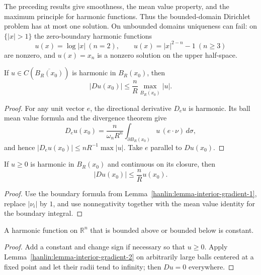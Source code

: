 \begin{remark}\label{hanlin:remark-mvp-harmonic-smooth}
The preceding results give smoothness, the mean value property, and the maximum
principle for harmonic functions. Thus the bounded-domain Dirichlet problem
has at most one solution. On unbounded domains uniqueness can fail: on
$\{|x|>1\}$ the zero-boundary harmonic functions
\[
u(x)=\log|x|\ (n=2),\qquad u(x)=|x|^{2-n}-1\ (n\ge3)
\]
are nonzero, and $u(x)=x_n$ is a nonzero solution on the upper half-space.
\end{remark}

\begin{lemma}\label{hanlin:lemma-interior-gradient-1}


If $u\in C(\overline{B_R(x_0)})$ is harmonic in $B_R(x_0)$, then
\[
|Du(x_0)|\le\frac nR\max_{\overline{B_R(x_0)}}|u|.
\]
\end{lemma}
\begin{proof}
\sketch For any unit vector $e$, the directional derivative $D_eu$ is harmonic.
Its ball mean value formula and the divergence theorem give
\[
D_eu(x_0)=\frac n{\omega_nR^n}\int_{\partial B_R(x_0)}u\,(e\cdot\nu)\,d\sigma,
\]
and hence $|D_eu(x_0)|\le nR^{-1}\max|u|$. Take $e$ parallel to $Du(x_0)$.
\end{proof}

\begin{lemma}\label{hanlin:lemma-interior-gradient-2}


If $u\ge0$ is harmonic in $B_R(x_0)$ and continuous on its closure, then
\[
|Du(x_0)|\le\frac nR u(x_0).
\]
\end{lemma}
\begin{proof}
\sketch Use the boundary formula from Lemma~\ref{hanlin:lemma-interior-gradient-1},
replace $|\nu_i|$ by $1$, and use nonnegativity together with the mean value
identity for the boundary integral.
\end{proof}

\begin{corollary}\label{hanlin:corollary-liouville}


A harmonic function on $\mathbb R^n$ that is bounded above or bounded below is
constant.
\end{corollary}
\begin{proof}
\sketch Add a constant and change sign if necessary so that $u\ge0$. Apply
Lemma~\ref{hanlin:lemma-interior-gradient-2} on arbitrarily large balls centered
at a fixed point and let their radii tend to infinity; then $Du=0$ everywhere.
\end{proof}

